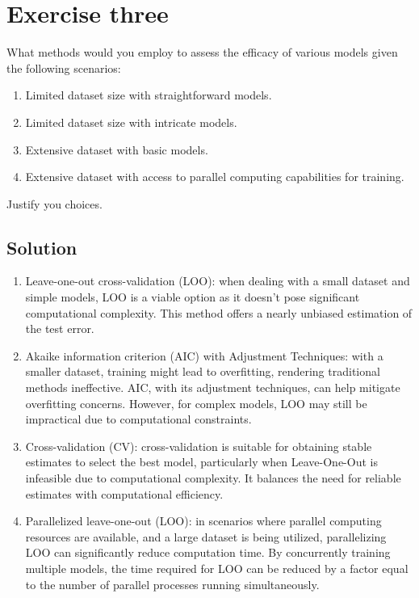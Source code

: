 \section{Exercise three}

What methods would you employ to assess the efficacy of various models given the following scenarios:
\begin{enumerate}
    \item Limited dataset size with straightforward models.
    \item Limited dataset size with intricate models.
    \item Extensive dataset with basic models.
    \item Extensive dataset with access to parallel computing capabilities for training.
\end{enumerate}
Justify you choices.

\subsection*{Solution}
\begin{enumerate}
    \item Leave-one-out cross-validation (LOO): when dealing with a small dataset and simple models, LOO is a viable option as it doesn't pose significant computational complexity. 
        This method offers a nearly unbiased estimation of the test error.
    \item Akaike information criterion (AIC) with Adjustment Techniques: with a smaller dataset, training might lead to overfitting, rendering traditional methods ineffective. 
        AIC, with its adjustment techniques, can help mitigate overfitting concerns. 
        However, for complex models, LOO may still be impractical due to computational constraints.
    \item Cross-validation (CV): cross-validation is suitable for obtaining stable estimates to select the best model, particularly when Leave-One-Out is infeasible due to computational complexity. 
        It balances the need for reliable estimates with computational efficiency.
    \item Parallelized leave-one-out (LOO): in scenarios where parallel computing resources are available, and a large dataset is being utilized, parallelizing LOO can significantly reduce computation time.
        By concurrently training multiple models, the time required for LOO can be reduced by a factor equal to the number of parallel processes running simultaneously.
\end{enumerate}